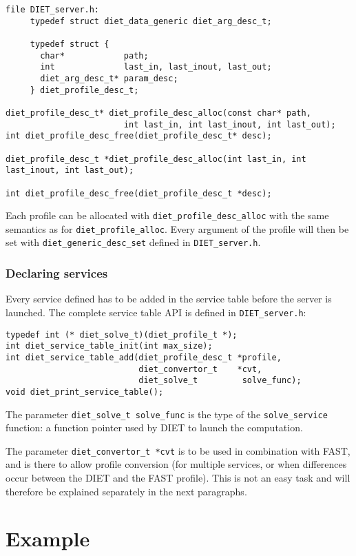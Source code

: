 {{{\begin{verbatim}
file DIET_server.h:
     typedef struct diet_data_generic diet_arg_desc_t;

     typedef struct {
       char*            path;
       int              last_in, last_inout, last_out;
       diet_arg_desc_t* param_desc;
     } diet_profile_desc_t;

diet_profile_desc_t* diet_profile_desc_alloc(const char* path,
                        int last_in, int last_inout, int last_out);
int diet_profile_desc_free(diet_profile_desc_t* desc);

diet_profile_desc_t *diet_profile_desc_alloc(int last_in, int last_inout, int last_out);

int diet_profile_desc_free(diet_profile_desc_t *desc);
\end{verbatim}
}

Each profile can be allocated with \texttt{diet\_profile\_desc\_alloc} with the
same semantics as for \texttt{diet\_profile\_alloc}. Every argument of the
profile will then be set with \texttt{diet\_generic\_desc\_set} defined in
\texttt{DIET\_server.h}.

\subsubsection*{Declaring services}

Every service defined has to be added in the service table before the server is
launched. The complete service table API is defined in \texttt{DIET\_server.h}:
{\footnotesize
\begin{verbatim}
typedef int (* diet_solve_t)(diet_profile_t *);
int diet_service_table_init(int max_size);
int diet_service_table_add(diet_profile_desc_t *profile,
                           diet_convertor_t    *cvt,
                           diet_solve_t         solve_func);
void diet_print_service_table();
\end{verbatim}
}

The parameter \texttt{diet\_solve\_t solve\_func} is the type of the
\texttt{solve\_service} function: a function pointer used by DIET to launch the
computation.

The parameter \texttt{diet\_convertor\_t *cvt} is to be used in
combination with FAST, and is there to allow profile conversion (for
multiple services, or when differences occur between the DIET and the
FAST profile). This is not an easy task and will therefore be
explained separately in the next paragraphs.



\section{Example}
\label{sec:sv_ex}

}}

